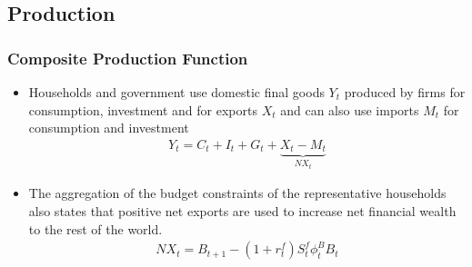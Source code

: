 \documentclass[11pt,aspectratio=169]{beamer}
\begin{document}
%
%
\subsection{Production}

\begin{frame}
\frametitle{Composite Production Function}
\scriptsize
\begin{itemize}
\item Households and government use domestic final goods $Y_t$ produced by firms for consumption, investment and for exports $X_{t}$ and can also use imports $M_t$ for consumption and investment
\begin{align}
Y_{t} = C_{t} + I_{t} + G_{t} + \underbrace{X_{t} - M_{t}}_{NX_{t}}
\end{align}
\item The aggregation of the budget constraints of the representative households also states that positive net exports are used to increase net financial wealth to the rest of the world.
\begin{align}
NX_t = B_{t+1} - (1 + r^{f}_{t}) S^{f}_{t} \phi^B_{t} B_{t}
\end{align}
\end{itemize}
\end{frame}
\end{document}
